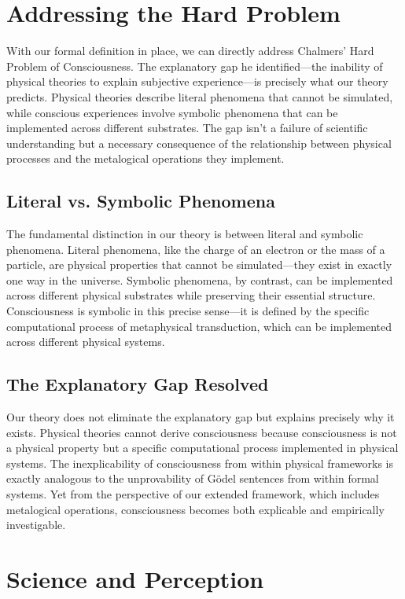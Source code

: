 \documentclass[runningheads]{llncs}
\begin{document}
\section{Addressing the Hard Problem}

With our formal definition in place, we can directly address Chalmers' Hard Problem of Consciousness. The explanatory gap he identified—the inability of physical theories to explain subjective experience—is precisely what our theory predicts. Physical theories describe literal phenomena that cannot be simulated, while conscious experiences involve symbolic phenomena that can be implemented across different substrates. The gap isn't a failure of scientific understanding but a necessary consequence of the relationship between physical processes and the metalogical operations they implement.

\subsection{Literal vs. Symbolic Phenomena}

The fundamental distinction in our theory is between literal and symbolic phenomena. Literal phenomena, like the charge of an electron or the mass of a particle, are physical properties that cannot be simulated—they exist in exactly one way in the universe. Symbolic phenomena, by contrast, can be implemented across different physical substrates while preserving their essential structure. Consciousness is symbolic in this precise sense—it is defined by the specific computational process of metaphysical transduction, which can be implemented across different physical systems.

\subsection{The Explanatory Gap Resolved}

Our theory does not eliminate the explanatory gap but explains precisely why it exists. Physical theories cannot derive consciousness because consciousness is not a physical property but a specific computational process implemented in physical systems. The inexplicability of consciousness from within physical frameworks is exactly analogous to the unprovability of Gödel sentences from within formal systems. Yet from the perspective of our extended framework, which includes metalogical operations, consciousness becomes both explicable and empirically investigable.

\section{Science and Perception}
\end{document}
